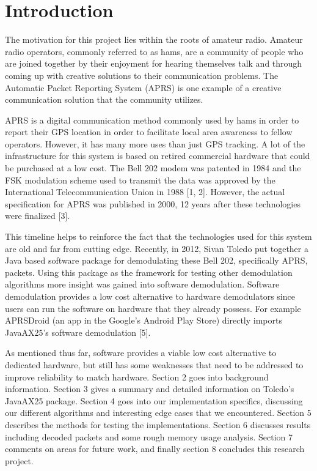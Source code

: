 \chapter{Introduction}

The motivation for this project lies within the roots of amateur radio. Amateur radio operators, commonly referred to as hams, are a community of people who are joined together by their enjoyment for hearing themselves talk and through coming up with creative solutions to their communication problems. The Automatic Packet Reporting System (APRS) is one example of a creative communication solution that the community utilizes.

APRS is a digital communication method commonly used by hams in order to report their GPS location in order to facilitate local area awareness to fellow operators. However, it has many more uses than just GPS tracking. A lot of the infrastructure for this system is based on retired commercial hardware that could be purchased at a low cost. The Bell 202 modem was patented in 1984 and the FSK modulation scheme used to transmit the data was approved by the International Telecommunication Union in 1988 [1, 2]. However, the actual specification for APRS was published in 2000, 12 years after these technologies were finalized [3].

This timeline helps to reinforce the fact that the technologies used for this system are old and far from cutting edge. Recently, in 2012, Sivan Toledo put together a Java based software package for demodulating these Bell 202, specifically APRS, packets. Using this package as the framework for testing other demodulation algorithms more insight was gained into software demodulation. Software demodulation provides a low cost alternative to hardware demodulators since users can run the software on hardware that they already possess. For example APRSDroid (an app in the Google’s Android Play Store) directly imports JavaAX25’s software demodulation [5]. 

As mentioned thus far, software provides a viable low cost alternative to dedicated hardware, but still has some weaknesses that need to be addressed to improve reliability to match hardware. Section 2 goes into background information. Section 3 gives a summary and detailed information on Toledo's JavaAX25 package. Section 4 goes into our implementation specifics, discussing our different algorithms and interesting edge cases that we encountered. Section 5 describes the methods for testing the implementations. Section 6 discusses results including decoded packets and some rough memory usage analysis. Section 7 comments on areas for future work, and finally section 8 concludes this research project.
